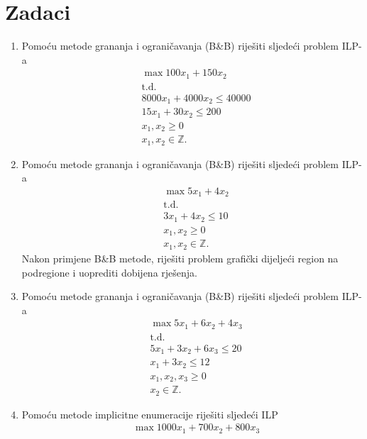 \documentclass[a4paper, utf8, 11pt, colorlinks]{book}
\theoremstyle{definition}
\begin{document}
 \section{Zadaci}
 \begin{enumerate}
 	\item %
 	Pomoću metode grananja i ograničavanja (B\&B) riješiti sljedeći problem ILP-a
 	\begin{align*}
 		&\max 100 x_1 + 150 x_2 \\
 		&\mbox{t.d.} \\
 		& 8000 x_1 + 4000 x_2 \leq 40 000 \\
 		& 15 x_1 + 30 x_2 \leq 200 \\
 		& x_1, x_2 \geq 0 \\
 		& x_1, x_2 \in \mathbb{Z}.
 	\end{align*}
   \item %
   	Pomoću metode grananja i ograničavanja  (B\&B) riješiti sljedeći problem ILP-a
   \begin{align*}
   	    &\max 5 x_1 + 4 x_2 \\
   	    &\mbox{t.d.} \\
   	    & 3 x_1 + 4 x_2 \leq 10 \\
   	    & x_1, x_2 \geq 0 \\
   	    & x_1, x_2 \in \mathbb{Z}.
   \end{align*}
Nakon primjene B\&B metode, riješiti problem grafički dijeljeći region na podregione i uoprediti dobijena rješenja. 
\item 	Pomoću metode grananja i ograničavanja  (B\&B) riješiti sljedeći problem ILP-a
\begin{align*}
	 &\max 5x_1 + 6 x_2 + 4 x_3 \\
	 &\mbox{t.d.} \\
	 & 5x_1 + 3 x_2 + 6 x_3 \leq 20 \\
	 & x_1 + 3x_2 \leq 12 \\
	 & x_1,x_2, x_3 \geq 0 \\
	 & x_2 \in \mathbb{Z}.
\end{align*}
\item %
 Pomoću metode implicitne enumeracije riješiti sljedeći ILP
\begin{align*}
  &\max 1000 x_1 + 700 x_2 + 800 x_3 \\

\end{align*}
\end{enumerate}
\end{document}
